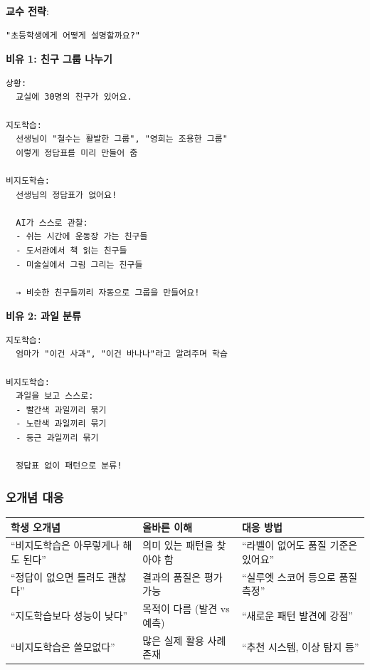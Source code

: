 \documentclass[a4paper, 11pt]{article}
\begin{document}
\textbf{교수 전략}:

\begin{verbatim}
"초등학생에게 어떻게 설명할까요?"
\end{verbatim}

\textbf{비유 1: 친구 그룹 나누기}

\begin{verbatim}
상황:
  교실에 30명의 친구가 있어요.
  
지도학습:
  선생님이 "철수는 활발한 그룹", "영희는 조용한 그룹"
  이렇게 정답표를 미리 만들어 줌

비지도학습:
  선생님의 정답표가 없어요!
  
  AI가 스스로 관찰:
  - 쉬는 시간에 운동장 가는 친구들
  - 도서관에서 책 읽는 친구들
  - 미술실에서 그림 그리는 친구들
  
  → 비슷한 친구들끼리 자동으로 그룹을 만들어요!
\end{verbatim}

\textbf{비유 2: 과일 분류}

\begin{verbatim}
지도학습:
  엄마가 "이건 사과", "이건 바나나"라고 알려주며 학습

비지도학습:
  과일을 보고 스스로:
  - 빨간색 과일끼리 묶기
  - 노란색 과일끼리 묶기
  - 둥근 과일끼리 묶기
  
  정답표 없이 패턴으로 분류!
\end{verbatim}

\hypertarget{uxc624uxac1cuxb150-uxb300uxc751}{%
\subsubsection{오개념 대응}\label{uxc624uxac1cuxb150-uxb300uxc751}}

\begin{longtable}{p{4.5cm}p{4.5cm}p{5.0cm}}
\toprule\noalign{}
\textbf{학생 오개념} & \textbf{올바른 이해} & \textbf{대응 방법} \\
\midrule\noalign{}
\endhead
\bottomrule\noalign{}
\endlastfoot
``비지도학습은 아무렇게나 해도 된다'' & 의미 있는 패턴을 찾아야 함 &
``라벨이 없어도 품질 기준은 있어요'' \\
``정답이 없으면 틀려도 괜찮다'' & 결과의 품질은 평가 가능 & ``실루엣
스코어 등으로 품질 측정'' \\
``지도학습보다 성능이 낮다'' & 목적이 다름 (발견 vs 예측) & ``새로운
패턴 발견에 강점'' \\
``비지도학습은 쓸모없다'' & 많은 실제 활용 사례 존재 & ``추천 시스템,
이상 탐지 등'' \\
\end{longtable}
\end{document}
